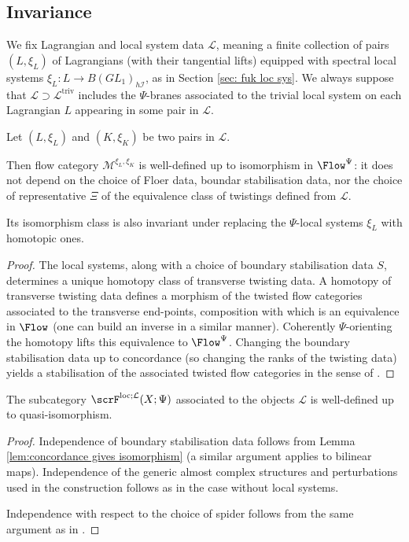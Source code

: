 \documentclass{TPmod}
\newcommand{\triv}{\mathrm{triv}}
\DeclareMathOperator{\loc}{loc}
\newcommand{\cI}{\mathcal{I}}
\newcommand{\cL}{\mathcal{L}}
\newcommand{\cM}{\mathcal{M}}
\numberwithin{equation}{section}
\begin{document}
\subsection{Invariance}

We fix Lagrangian and local system data $\cL$, meaning a finite collection of pairs $(L,\xi_L)$ of Lagrangians (with their tangential lifts) equipped with spectral local systems $\xi_L : L \to B(GL_1)_{h\cI}$, as in Section \ref{sec: fuk loc sys}. We always suppose that $\cL \supset \cL^{\triv}$ includes the $\Psi$-branes associated to the trivial local system on each Lagrangian $L$ appearing in some pair in $\cL$.


    \begin{lem}\label{lem:concordance gives isomorphism}
        Let $(L, \xi_L)$ and $(K, \xi_K)$ be two pairs in $\cL$.
        
        Then flow category $\cM^{\xi_L, \xi_K}$ is well-defined up to isomorphism in $\Flow^{\Psi}$: it does not depend on the choice of Floer data, boundar stabilisation data, nor the choice of representative $\Xi$ of the equivalence class of twistings defined from $\cL$. 

        Its isomorphism class is also invariant under replacing the $\Psi$-local systems $\xi_L$ with homotopic ones.
    \end{lem}

    \begin{proof}
        The local systems, along with a choice of boundary stabilisation data $S$, determines a unique homotopy class of transverse twisting data.  A homotopy  of transverse twisting data defines a morphism of the twisted flow categories associated to the transverse end-points, composition with which is an equivalence in $\Flow$ (one can build an inverse in a similar manner). Coherently $\Psi$-orienting the homotopy lifts this equivalence to $\Flow^{\Psi}$.  Changing the boundary stabilisation data up to concordance (so changing the ranks of the twisting data) yields a stabilisation of the associated twisted flow categories in the sense of \cite[Remark 5.8]{PS2}. 
    \end{proof}

\begin{prop}
    The subcategory $\scrF^{\loc;\cL}(X;\Psi)$ associated to the objects $\cL$ is well-defined up to quasi-isomorphism.
\end{prop}

\begin{proof}
    Independence of boundary stabilisation data follows from Lemma \ref{lem:concordance gives isomorphism} (a similar argument applies to bilinear maps). Independence of the generic almost complex structures and perturbations used in the construction follows as in the case without local systems.

    Independence with respect to the choice of spider follows from the same argument as in \cite[Section 6.2]{BDHO}.
\end{proof}
\end{document}
